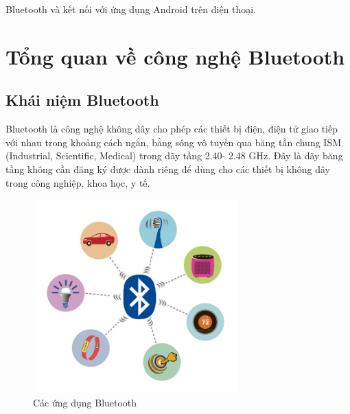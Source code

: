 Bluetooth và kết nối với ứng dụng Android trên điện thoại.

\nomenclature[g-p]{$\pi$}{ $\simeq 3.14\ldots$}                                             %


\section{Tổng quan về công nghệ Bluetooth} %

\subsection{Khái niệm Bluetooth}
Bluetooth là công nghệ không dây cho phép các thiết bị điện, điện tử giao tiếp với nhau trong khoảng cách ngắn, bằng sóng vô tuyến qua băng tần chung ISM (Industrial, Scientific, Medical) trong dãy tầng 2.40- 2.48 GHz. Đây là dãy băng tầng không cần đăng ký được dành riêng để dùng cho các thiết bị không dây trong công nghiệp, khoa học, y tế.
	\begin{figure}[ht]
		\centering    
		\includegraphics[width=0.7\textwidth]{btuse}
		\caption[Các ứng dụng Bluetooth]{Các ứng dụng Bluetooth}
		\label{fig:btuse}
	\end{figure}
	
